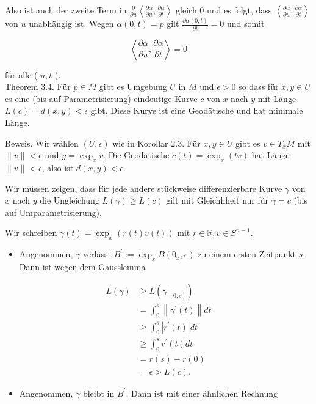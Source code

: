 \documentclass[10pt]{article}
\begin{document}
Also ist auch der zweite Term in $\frac{\partial}{\partial u}\left\langle\frac{\partial \alpha}{\partial u}, \frac{\partial \alpha}{\partial t}\right\rangle$ gleich 0 und es folgt, dass $\left\langle\frac{\partial \alpha}{\partial u}, \frac{\partial \alpha}{\partial t}\right\rangle$ von $u$ unabhängig ist. Wegen $\alpha(0, t)=p$ gilt $\frac{\partial \alpha(0, t)}{\partial t}=0$ und somit

$$
\left\langle\frac{\partial \alpha}{\partial u}, \frac{\partial \alpha}{\partial t}\right\rangle=0
$$

für alle ( $u, t$ ).\\
Theorem 3.4. Für $p \in M$ gibt es Umgebung $U$ in $M$ und $\epsilon>0$ so dass für $x, y \in U$ es eine (bis auf Parametrisierung) eindeutige Kurve $c$ von $x$ nach $y$ mit Länge $L(c)=d(x, y)<\epsilon$ gibt. Diese Kurve ist eine Geodätische und hat minimale Länge.

Beweis. Wir wählen $(U, \epsilon)$ wie in Korollar 2.3. Für $x, y \in U$ gibt es $v \in T_{x} M$ mit $\|v\|<\epsilon$ und $y=\exp _{x} v$. Die Geodätische $c(t)=\exp _{x}(t v)$ hat Länge $\|v\|<\epsilon$, also ist $d(x, y)<\epsilon$.

Wir müssen zeigen, dass für jede andere stückweise differenzierbare Kurve $\gamma$ von $x$ nach $y$ die Ungleichung $L(\gamma) \geq L(c)$ gilt mit Gleichhheit nur für $\gamma=c$ (bis auf Umparametrisierung).

Wir schreiben $\gamma(t)=\exp _{x}(r(t) v(t))$ mit $r \in \mathbb{R}, v \in S^{n-1}$.

\begin{itemize}
  \item Angenommen, $\gamma$ verlässt $B^{\prime}:=\exp _{x} B\left(0_{x}, \epsilon\right)$ zu einem ersten Zeitpunkt $s$. Dann ist wegen dem Gausslemma
\end{itemize}

$$
\begin{aligned}
L(\gamma) & \geq L\left(\left.\gamma\right|_{[0, s]}\right) \\
& =\int_{0}^{s}\left\|\gamma^{\prime}(t)\right\| d t \\
& \geq \int_{0}^{s}\left|r^{\prime}(t)\right| d t \\
& \geq \int_{0}^{s} r^{\prime}(t) d t \\
& =r(s)-r(0) \\
& =\epsilon>L(c) .
\end{aligned}
$$

\begin{itemize}
  \item Angenommen, $\gamma$ bleibt in $B^{\prime}$. Dann ist mit einer ähnlichen Rechnung
\end{itemize}
\end{document}
